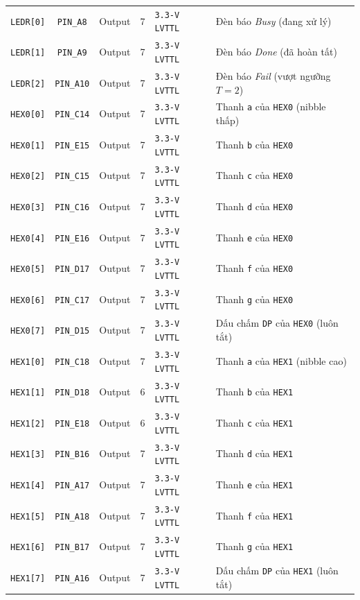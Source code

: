 \documentclass[11pt,a4paper]{report}
\begin{document}
\begin{table}[!htb]
\begin{tabularx}{\textwidth}{l c c c l X}
        \midrule
        \texttt{LEDR[0]} & \texttt{PIN\_A8} & Output & 7 & \texttt{3.3-V LVTTL} & Đèn báo \textit{Busy} (đang xử lý) \\
        \texttt{LEDR[1]} & \texttt{PIN\_A9} & Output & 7 & \texttt{3.3-V LVTTL} & Đèn báo \textit{Done} (đã hoàn tất) \\
        \texttt{LEDR[2]} & \texttt{PIN\_A10} & Output & 7 & \texttt{3.3-V LVTTL} & Đèn báo \textit{Fail} (vượt ngưỡng $T=2$) \\
        \texttt{HEX0[0]} & \texttt{PIN\_C14} & Output & 7 & \texttt{3.3-V LVTTL} & Thanh \texttt{a} của \texttt{HEX0} (nibble thấp) \\
        \texttt{HEX0[1]} & \texttt{PIN\_E15} & Output & 7 & \texttt{3.3-V LVTTL} & Thanh \texttt{b} của \texttt{HEX0} \\
        \texttt{HEX0[2]} & \texttt{PIN\_C15} & Output & 7 & \texttt{3.3-V LVTTL} & Thanh \texttt{c} của \texttt{HEX0} \\
        \texttt{HEX0[3]} & \texttt{PIN\_C16} & Output & 7 & \texttt{3.3-V LVTTL} & Thanh \texttt{d} của \texttt{HEX0} \\
        \texttt{HEX0[4]} & \texttt{PIN\_E16} & Output & 7 & \texttt{3.3-V LVTTL} & Thanh \texttt{e} của \texttt{HEX0} \\
        \texttt{HEX0[5]} & \texttt{PIN\_D17} & Output & 7 & \texttt{3.3-V LVTTL} & Thanh \texttt{f} của \texttt{HEX0} \\
        \texttt{HEX0[6]} & \texttt{PIN\_C17} & Output & 7 & \texttt{3.3-V LVTTL} & Thanh \texttt{g} của \texttt{HEX0} \\
        \texttt{HEX0[7]} & \texttt{PIN\_D15} & Output & 7 & \texttt{3.3-V LVTTL} & Dấu chấm \texttt{DP} của \texttt{HEX0} (luôn tắt) \\
        \texttt{HEX1[0]} & \texttt{PIN\_C18} & Output & 7 & \texttt{3.3-V LVTTL} & Thanh \texttt{a} của \texttt{HEX1} (nibble cao) \\
        \texttt{HEX1[1]} & \texttt{PIN\_D18} & Output & 6 & \texttt{3.3-V LVTTL} & Thanh \texttt{b} của \texttt{HEX1} \\
        \texttt{HEX1[2]} & \texttt{PIN\_E18} & Output & 6 & \texttt{3.3-V LVTTL} & Thanh \texttt{c} của \texttt{HEX1} \\
        \texttt{HEX1[3]} & \texttt{PIN\_B16} & Output & 7 & \texttt{3.3-V LVTTL} & Thanh \texttt{d} của \texttt{HEX1} \\
        \texttt{HEX1[4]} & \texttt{PIN\_A17} & Output & 7 & \texttt{3.3-V LVTTL} & Thanh \texttt{e} của \texttt{HEX1} \\
        \texttt{HEX1[5]} & \texttt{PIN\_A18} & Output & 7 & \texttt{3.3-V LVTTL} & Thanh \texttt{f} của \texttt{HEX1} \\
        \texttt{HEX1[6]} & \texttt{PIN\_B17} & Output & 7 & \texttt{3.3-V LVTTL} & Thanh \texttt{g} của \texttt{HEX1} \\
        \texttt{HEX1[7]} & \texttt{PIN\_A16} & Output & 7 & \texttt{3.3-V LVTTL} & Dấu chấm \texttt{DP} của \texttt{HEX1} (luôn tắt) \\
        \bottomrule
    \end{tabularx}
\end{table}
\end{document}
